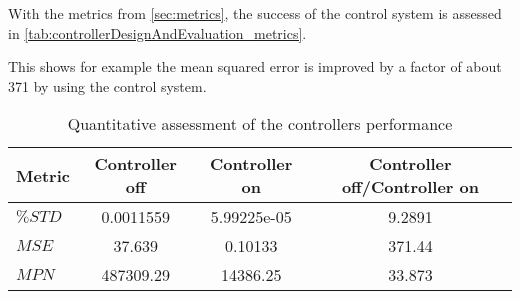 With the metrics from \autoref{sec:metrics}, the success of the control system is assessed in \autoref{tab:controllerDesignAndEvaluation_metrics}.

This shows for example the mean squared error is improved by a factor of about \num{371} by using the control system.

\begin{table}[tbh]
\centering
\caption{Quantitative assessment of the controllers performance}\label{tab:controllerDesignAndEvaluation_metrics}
\begin{tabular}{lSSS}
	\toprule
	Metric  & {Controller off} & {Controller on} & {Controller off/Controller on} \\ \midrule
	$\%STD$ & 0.0011559        & 5.99225e-05     & 9.2891                         \\
	$MSE$   & 37.639           & 0.10133         & 371.44                         \\
	$MPN$   & 487309.29        & 14386.25        & 33.873                         \\ \bottomrule
\end{tabular}
\end{table}














